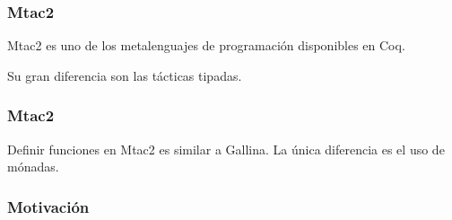 \documentclass{beamer}
\begin{document}
\begin{frame}
\frametitle{Mtac2}

Mtac2 es uno de los metalenguajes de programación disponibles en Coq.

Su gran diferencia son las tácticas tipadas.

\end{frame}

\begin{frame}
\frametitle{Mtac2}

Definir funciones en Mtac2 es similar a Gallina.
La única diferencia es el uso de mónadas.
\vspace{\baselineskip}

\end{frame}

\begin{frame}
\frametitle{Motivación}
\end{frame}
\end{document}
